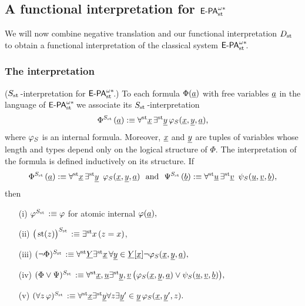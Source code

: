 \subsection{A functional interpretation for $\epaststar$} \label{s:Shoenfield}

We will now combine negative translation and our functional interpretation $\D$ to obtain a functional interpretation of the classical system $\epaststar$.

\subsubsection*{The interpretation}\label{ss:dst:shoenfield}

\begin{dfn} \label{d:stS} ($\Sh$-interpretation for $\epaststar$.) To each formula $\Phi(\tup{a})$ with free variables $\tup{a}$ in the language of $\epaststar$ we associate its {$\Sh$-interpretation}
\[
\Phi^\Sh(\tup{a}):\equiv\forallst \tup{x}\,\existsst \tup{y}\,
\phi_\Shb(\tup{x},\tup{y}, \tup{a})
\text{,}
\]
where $\phi_\Shb$ is an internal formula. Moreover,  $\tup{x}$ and $\tup{y}$ are tuples of variables whose length and types depend only on the logical structure of $\Phi$. The interpretation of the formula is defined inductively on its
structure. If
\[
\Phi^\Sh(\tup{a}):\equiv\forallst \tup{x}\,\existsst \tup{y}\, \
\phi_\Shb(\tup{x},\tup{y}, \tup{a}) \
\text{ and } \ \Psi^\Sh(\tup{b}):\equiv\forallst \tup{u}\,\existsst \tup{v}\, \
\psi_\Shb(\tup{u},\tup{v}, \tup{b}),
\]
then
\begin{enumerate}
\item[(i)] $\phi^\Sh
:\equiv \phi$ for atomic internal
$\phi(\tup{a}),$
\item[(ii)] $\big(\st(z) \big)^\Sh :\equiv \existsst x \, ( z = x)$,
\item[(iii)] $(\neg \Phi)^\Sh :\equiv \forallst \tup{Y} \existsst \tup{x} \,
\forall \tup y \in \tup Y[\tup x] \neg \phi_\Shb(\tup{x}, \tup y, \tup a),$
\item[(iv)] $(\Phi \vee \Psi)^\Sh :\equiv
             \forallst \tup{x},\tup{u} \existsst \tup{y},\tup{v} \,
\big(\phi_\Shb(\tup{x},\tup{y}, \tup a) \vee \psi_\Shb(\tup{u},\tup{v}, \tup b)\big),$
\item[(v)] $(\forall z \, \phi)^\Sh :\equiv \forallst \tup{x}
\existsst \tup{y} \forall z \exists {\tup y}' \in \tup y \, \phi_\Shb(\tup x,\tup{y}', z).$
\end{enumerate}
\end{dfn}

